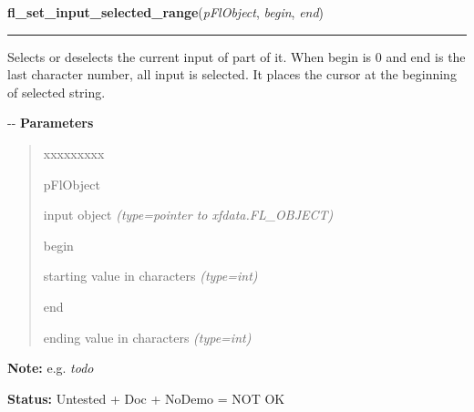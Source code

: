 \hspace{.8\funcindent}\begin{boxedminipage}{\funcwidth}

    \raggedright \textbf{fl\_set\_input\_selected\_range}(\textit{pFlObject}, \textit{begin}, \textit{end})

    \vspace{-1.5ex}

    \rule{\textwidth}{0.5\fboxrule}
\setlength{\parskip}{2ex}

Selects or deselects the current input of part of it. When begin is
0 and end is the last character number, all input is selected. It places
the cursor at the beginning of selected string.

-{}-
\setlength{\parskip}{1ex}
      \textbf{Parameters}
      \vspace{-1ex}

      \begin{quote}
        \begin{Ventry}{xxxxxxxxx}

          \item[pFlObject]


input object
            {\it (type=pointer to xfdata.FL\_OBJECT)}

          \item[begin]


starting value in characters
            {\it (type=int)}

          \item[end]


ending value in characters
            {\it (type=int)}

        \end{Ventry}

      \end{quote}

\textbf{Note:} 
e.g. \emph{todo}


\textbf{Status:} 
Untested + Doc + NoDemo = NOT OK


    \end{boxedminipage}

    \label{xformslib:flinput:fl_get_input_selected_range}

    \vspace{0.5ex}

